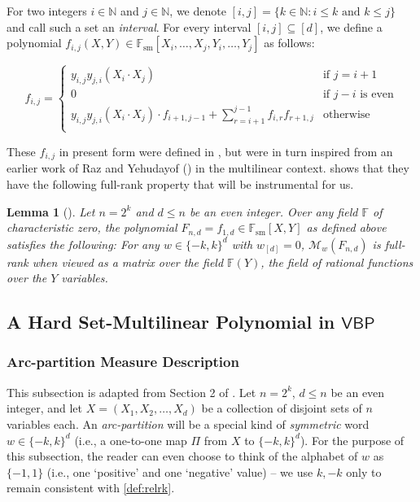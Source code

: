 \documentclass[10pt,a4paper]{article}
\newtheorem{lem}[theorem]{Lemma}
\theoremstyle{definition}%
\theoremstyle{plain}
\newcommand{\VBP}{\mathsf{VBP}}
\newcommand{\N}{\mathbb N}
\newcommand{\F}{\mathbb F}
\newcommand{\Fsm}{\mathbb{F}_{\mathrm{sm}}}
\newcommand{\calM}{\mathcal{M}}
\begin{document}
For two integers $i \in \N$ and $j \in \N$, we denote $[i, j] = \{k \in \N : i \leq k \text{ and } k \leq j\}$ and call such a set an \emph{interval}. For every interval $[i, j] \subseteq [d]$, we define a polynomial $f_{i,j}(X,Y)\in \Fsm[X_i,\ldots,X_j,Y_i,\ldots, Y_j]$ as follows:

\[
f_{i,j} = \begin{cases}
y_{i,j}y_{j,i}(X_i\cdot X_j) &\text{if $j = i+1$}\\
0 &\text{if $j-i$ is even}\\
y_{i,j}y_{j,i}(X_i\cdot X_j)\cdot f_{i+1,j-1} + \sum_{r = i+1}^{j-1} f_{i,r}f_{r+1,j} &\text{otherwise}\\
\end{cases}
\]

These $f_{i,j}$ in present form were defined in \cite{KushS23}, but were in turn inspired from an earlier work of Raz and Yehudayof (\cite{RazY08}) in the multilinear context. \cite{KushS23} shows that they have the following full-rank property that will be instrumental for us.
\begin{lem}[\cite{KushS23}]\label{lem:Fn-VP-props}
    Let $n = 2^k$ and $d\leq n$ be an even integer. Over any field $\F$ of characteristic zero, the polynomial $F_{n,d} = f_{1,d}\in\Fsm[X,Y]$ as defined above satisfies the following: For any $w\in\{-k,k\}^d$ with $w_{[d]} = 0$, $\calM_w(F_{n,d})$ is full-rank when viewed as a matrix over the field $\F(Y)$, the field of rational functions over the $Y$ variables.
\end{lem}


\subsection{A Hard Set-Multilinear Polynomial in $\VBP$}\label{subsec:VBP}
\subsubsection{Arc-partition Measure Description}
This subsection is adapted from Section 2 of \cite{DvirMPY12}. Let $n = 2^k$, $d\leq n$ be an even integer, and let $X = (X_1, X_2, \ldots, X_{d})$ be a collection of disjoint sets of $n$ variables each.
An \emph{arc-partition} will be a special kind of \emph{symmetric} word $w\in \{-k,k\}^d$ (i.e., a one-to-one map $\Pi$ from $X$ to $\{-k,k\}^d$). For the purpose of this subsection, the reader can even choose to think of the alphabet of $w$ as $\{-1,1\}$ (i.e., one `positive' and one `negative' value) -- we use $k,-k$ only to remain consistent with \autoref{def:relrk}.
\end{document}
